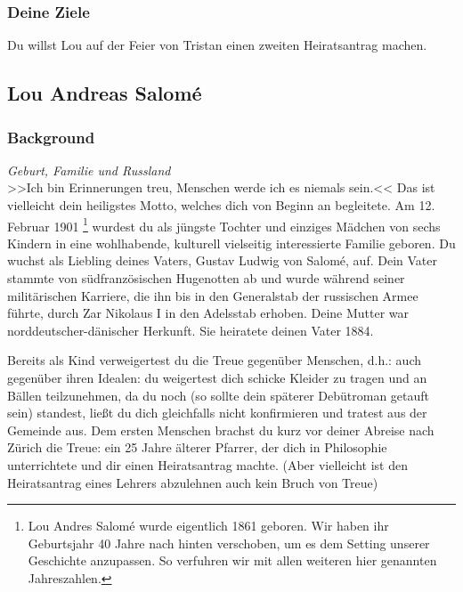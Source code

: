 \documentclass[12pt, a4paper, openany]{report}
\begin{document}
\subsubsection{Deine Ziele}
Du willst Lou auf der Feier von Tristan einen zweiten Heiratsantrag machen.

\subsection{Lou Andreas Salomé}
\subsubsection{Background}

\textit{Geburt, Familie und Russland}\\
>>Ich bin Erinnerungen treu, Menschen werde ich es niemals sein.<< 
Das ist vielleicht dein heiligstes Motto, welches dich von Beginn an begleitete.
Am 12. Februar 1901%
\footnote{
  Lou Andres Salomé wurde eigentlich 1861 geboren. 
  Wir haben ihr Geburtsjahr 40 Jahre nach hinten verschoben, um es dem Setting unserer Geschichte anzupassen. 
  So verfuhren wir mit allen weiteren hier genannten Jahreszahlen.
}
wurdest du als jüngste Tochter und einziges Mädchen von sechs Kindern in eine wohlhabende, kulturell vielseitig interessierte Familie geboren. 
Du wuchst als Liebling deines Vaters, Gustav Ludwig von Salomé, auf. 
Dein Vater stammte von südfranzösischen Hugenotten ab und wurde während seiner militärischen Karriere, die ihn bis in den Generalstab der russischen Armee führte, durch Zar Nikolaus I in den Adelsstab erhoben.
Deine Mutter war norddeutscher-dänischer Herkunft. 
Sie heiratete deinen Vater 1884.

Bereits als Kind verweigertest du die Treue gegenüber Menschen, d.h.: auch gegenüber ihren Idealen:
du weigertest dich schicke Kleider zu tragen und an Bällen teilzunehmen, da du noch  (so sollte dein späterer Debütroman getauft sein) standest, ließt du dich gleichfalls nicht konfirmieren und tratest aus der Gemeinde aus.
Dem ersten Menschen brachst du kurz vor deiner Abreise nach Zürich die Treue: 
ein 25 Jahre älterer Pfarrer, der dich in Philosophie unterrichtete und dir einen Heiratsantrag machte. 
(Aber vielleicht ist den Heiratsantrag eines Lehrers abzulehnen auch kein Bruch von Treue)\\
\end{document}
